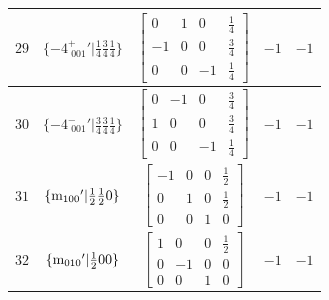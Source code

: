 \documentclass[fleqn,8pt]{jsarticle}
\begin{document}
\begin{longtable}{ccccc}
$ 29 $ & $ \{-4^{+}_{\,\,001}{}'|\frac{1}{4} \frac{3}{4} \frac{1}{4}\} $ & $ \begin{bmatrix} 0 & 1 & 0 & \frac{1}{4} \\ -1 & 0 & 0 & \frac{3}{4} \\ 0 & 0 & -1 & \frac{1}{4} \end{bmatrix} $ & $ -1 $ & $ -1 $ \\ \hline
$ 30 $ & $ \{-4^{-}_{\,\,001}{}'|\frac{3}{4} \frac{3}{4} \frac{1}{4}\} $ & $ \begin{bmatrix} 0 & -1 & 0 & \frac{3}{4} \\ 1 & 0 & 0 & \frac{3}{4} \\ 0 & 0 & -1 & \frac{1}{4} \end{bmatrix} $ & $ -1 $ & $ -1 $ \\ \hline
$ 31 $ & $ \{{\rm m}_{100}{}'|\frac{1}{2} \frac{1}{2} 0\} $ & $ \begin{bmatrix} -1 & 0 & 0 & \frac{1}{2} \\ 0 & 1 & 0 & \frac{1}{2} \\ 0 & 0 & 1 & 0 \end{bmatrix} $ & $ -1 $ & $ -1 $ \\ \hline
$ 32 $ & $ \{{\rm m}_{010}{}'|\frac{1}{2} 0 0\} $ & $ \begin{bmatrix} 1 & 0 & 0 & \frac{1}{2} \\ 0 & -1 & 0 & 0 \\ 0 & 0 & 1 & 0 \end{bmatrix} $ & $ -1 $ & $ -1 $ \\
\end{longtable}
\end{document}

